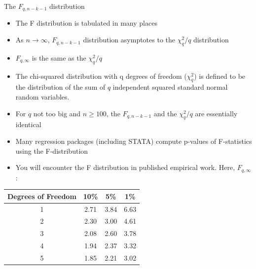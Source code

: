\documentclass[notes,10pt, aspectratio=169]{beamer}
\begin{document}
\begin{frame}{The $F_{q,n-k-1}$ distribution}
\begin{itemize}
    \item The F distribution is tabulated in many places
    \item As $n \rightarrow \infty$, $F_{q,n-k-1}$ distribution asymptotes to the $\chi^2_q/q$ distribution
    \item $F_{q,\infty}$ is the same as the $\chi^2_q/q$ 
     \item The chi-squared distribution with q degrees of freedom ($\chi_q^2$) is defined to be the distribution of the sum of $q$ independent squared standard normal random variables.
    \item For $q$ not too big and $n\geq 100$, the $F_{q,n-k-1}$ and the $\chi^2_q/q$ are essentially identical
    \item Many regression packages (including STATA) compute p-values of F-statistics using the F-distribution
    \item You will encounter the F distribution in published empirical work. Here, $F_{q,\infty}$:
\end{itemize}
\begin{table}[]
\begin{tabular}{|c|c|c|c|}
\hline
\rowcolor[HTML]{DAE8FC} 
{\color[HTML]{000000} \textbf{Degrees of Freedom}} & {\color[HTML]{000000} \textbf{10\%}} & {\color[HTML]{000000} \textbf{5\%}} & {\color[HTML]{000000} \textbf{1\%}} \\ \hline
1                                                  & 2.71                                 & 3.84                                & 6.63                                \\ \hline
2                                                  & 2.30                                 & 3.00                                & 4.61                                \\ \hline
3                                                  & 2.08                                 & 2.60                                & 3.78                                \\ \hline
4                                                  & 1.94                                 & 2.37                                & 3.32                                \\ \hline
5                                                  & 1.85                                 & 2.21                                & 3.02                                \\ \hline
\end{tabular}
\end{table}
\end{frame}
\end{document}
